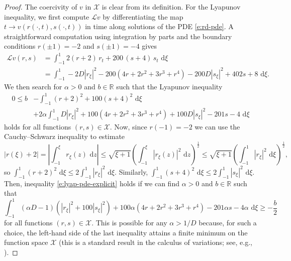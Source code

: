 \documentclass[11pt]{amsart}
\numberwithin{equation}{section}
\theoremstyle{plain}
\theoremstyle{definition}
\theoremstyle{remark}
\newcommand{\R}{\mathbb{R}}
\newcommand{\de}{\,\mathrm{d}}
\begin{document}
\begin{proof}
    The coercivity of $v$ in $\mathcal{X}$ is clear from its definition.  For the Lyapunov inequality, we first compute $\mathcal{L}v$ by differentiating the map $t\to v(r(\cdot, t), s(\cdot, t))$ in time along solutions of the PDE \cref{e:rd-pde}. A straightforward computation using integration by parts and the boundary conditions $r(\pm1) = -2$ and $s(\pm1)=-4$ gives
    \begin{align*}
        \mathcal{L}v(r,s) 
        &=
        \int_{-1}^1 2(r+2) \, r_t + 200\, (s+4)  \, s_t \,\de \xi\\
        &=
        \int_{-1}^1 - 2D |r_\xi|^2 - 200(4r +2r^2 + 3r^3 + r^4) - 200 D |s_\xi|^2 + 402 s + 8 \, \de\xi.
    \end{align*}
    We then search for $\alpha>0$ and $b\in\R$ such that the Lyapunov inequality
    \begin{align}\label{e:lyap-pde-explicit}
        0 
        \leq 
        b 
        &- \int_{-1}^1 (r+2)^2 + 100 (s+4)^2 \, \de\xi\\\nonumber
        &+
        2\alpha \int_{-1}^1 D |r_\xi|^2 + 100(4r +2r^2 + 3r^3 + r^4) + 100 D |s_\xi|^2 - 201 s - 4
        \,\de\xi
    \end{align}
    holds for all functions $(r,s)\in\mathcal{X}$. Now, since $r(-1)=-2$ we can use the Cauchy--Schwarz inequality to estimate
    \begin{equation*}
        |r(\xi)+2| 
        = \left|\int_{-1}^\xi r_\xi(z) \,\de z\right| 
        \leq \sqrt{\xi+1}  \left(\int_{-1}^\xi |r_\xi(z)|^2 \,\de z \right)^{\frac{1}{2}} 
        \leq \sqrt{\xi+1} \left( \int_{-1}^1 |r_\xi|^2 \,\de\xi\right)^{\frac{1}{2}},
    \end{equation*}
    so $\int_{-1}^1 (r+2)^2 \,\de\xi \leq 2 \int_{-1}^1 |r_\xi|^2 \,\de\xi$. Similarly, $\int_{-1}^1 (s+4)^2 \,\de\xi \leq 2 \int_{-1}^1 |s_\xi|^2 \,\de\xi$.
    Then, inequality \cref{e:lyap-pde-explicit} holds if we can find $\alpha>0$ and $b\in\R$ such that
    \begin{equation*}
        \int_{-1}^1 
                (\alpha D-1) \left( |r_\xi|^2 + 100|s_\xi|^2 \right) + 100\alpha (4r +2r^2 + 3r^3 + r^4)
               - 201\alpha s - 4\alpha
            \,\de \xi
            \geq -\frac{b}{2}
    \end{equation*}
    for all functions $(r,s)\in \mathcal{X}$. This is possible for any $\alpha > 1/D$ because, for such a choice, the left-hand side of the last inequality attains a finite minimum on the function space $\mathcal{X}$ (this is a standard result in the calculus of variations; see, e.g., \cite{rindler2018}).
\end{proof}
\end{document}
